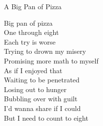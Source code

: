 A Big Pan of Pizza

Big pan of pizza\\
One through eight\\
Each try is worse\\
Trying to drown my misery\\
Promising more math to myself\\
As if I enjoyed that\\
Waiting to be penetrated\\
Losing out to hunger\\
Bubbling over with guilt\\
I'd wanna share if I could\\
But I need to count to eight\\

